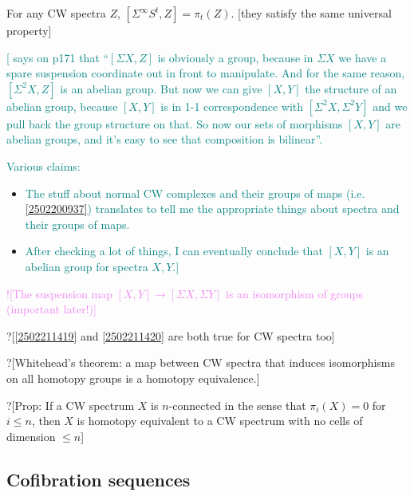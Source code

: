 \documentclass{MetricNotes2023}
\def\textcolour{\textcolor}
\begin{document}
\begin{remark}
For any CW spectra \(Z\), \([\Sigma^\infty S^t, Z]=\pi_t(Z)\). [they satisfy the same universal property]
\end{remark}

\textcolour{teal}{[\autocite{stable_homotopy} says on p171 that ``\([\Sigma X, Z]\) is obviously a group, because in \(\Sigma X\) we have a spare suspension coordinate out in front to manipulate. And for the same reason, \([\Sigma^2 X, Z]\) is an abelian group. But now we can give \([X,Y]\) the structure of an abelian group, because \([X,Y]\) is in 1-1 correspondence with \([\Sigma^2X, \Sigma^2 Y]\) and we pull back the group structure on that. So now our sets of morphisms \([X,Y]\) are abelian groups, and it's easy to see that composition is bilinear''.}

\textcolour{teal}{Various claims:}
\begin{itemize}

\item \textcolour{teal}{The stuff about normal CW complexes and their groups of maps (i.e. \ref{2502200937}) translates to tell me the appropriate things about spectra and their groups of maps.}
\item \textcolour{teal}{After checking a lot of things, I can eventually conclude that \([X, Y]\) is an abelian group for spectra \(X, Y\).]}
\end{itemize}

\textcolour{violet}{![The suspension map \([X,Y]\to[\Sigma X, \Sigma Y]\) is an isomorphism of groups (important later!)]}

?[\ref{2502211419} and \ref{2502211420} are both true for CW spectra too]

?[Whitehead's theorem: a map between CW spectra that induces isomorphisms on all homotopy groups is a homotopy equivalence.]

?[Prop: If a CW spectrum \(X\) is \(n\)-connected in the sense that \(\pi_i(X)=0\) for \(i\leq n\), then \(X\) is homotopy equivalent to a CW spectrum with no cells of dimension \(\leq n\)]

\subsection{Cofibration sequences}\label{2503291211}
\end{document}
